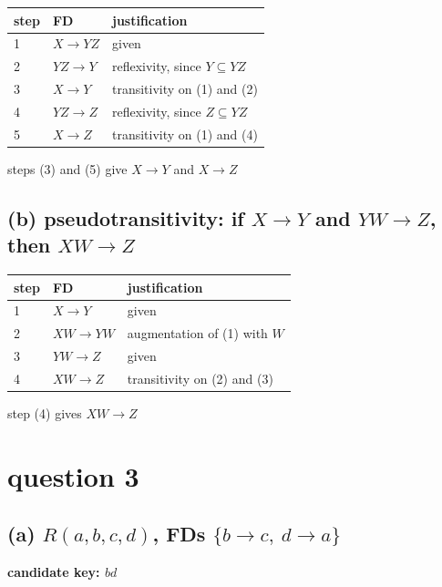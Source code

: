 \documentclass[11pt]{article}
\begin{document}
\begin{center}
\begin{tabular}{lll}
\toprule
step & FD & justification \\
\midrule
1 & $X \to YZ$ & given \\
2 & $YZ \to Y$ & reflexivity, since $Y \subseteq YZ$ \\
3 & $X \to Y$  & transitivity on (1) and (2) \\
4 & $YZ \to Z$ & reflexivity, since $Z \subseteq YZ$ \\
5 & $X \to Z$  & transitivity on (1) and (4) \\
\bottomrule
\end{tabular}
\end{center}

\noindent steps (3) and (5) give $X \to Y$ and $X \to Z$ 

\subsection*{(b) pseudotransitivity: if $X \to Y$ and $YW \to Z$, then $XW \to Z$}

\begin{center}
\begin{tabular}{lll}
\toprule
step & FD & justification \\
\midrule
1 & $X \to Y$   & given \\
2 & $XW \to YW$ & augmentation of (1) with $W$ \\
3 & $YW \to Z$  & given \\
4 & $XW \to Z$  & transitivity on (2) and (3) \\
\bottomrule
\end{tabular}
\end{center}

\noindent step (4) gives $XW \to Z$

\section*{question 3}

\subsection*{(a) $R(a,b,c,d)$, FDs $\{b \to c,\ d \to a\}$}

\noindent\textbf{candidate key: $bd$ }
\end{document}
